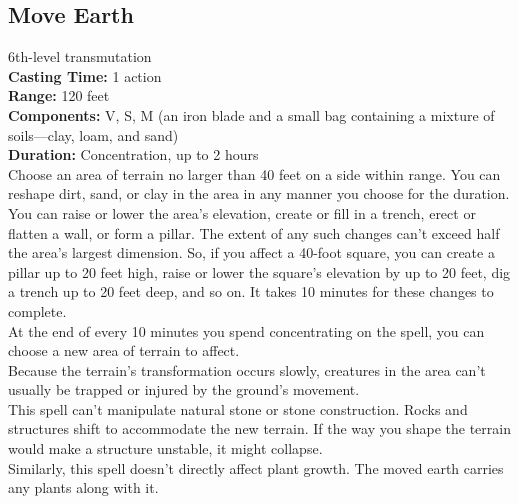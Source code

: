 \documentclass[11pt, A4paper, english]{article}
\begin{document}
		\subsection{Move Earth}
6th-level transmutation \\
\textbf{Casting Time:} 1 action \\
\textbf{Range:} 120 feet \\
\textbf{Components:} V, S, M (an iron blade and a small bag containing a mixture of soils—clay, loam, and sand) \\
\textbf{Duration:} Concentration, up to 2 hours \\
Choose an area of terrain no larger than 40 feet on a side within range. You can reshape dirt, sand, or clay in the area in any manner you choose for the duration. You can raise or lower the area’s elevation, create or fill in a trench, erect or flatten a wall, or form a pillar. The extent of any such changes can’t exceed half the area’s largest dimension. So, if you affect a 40-foot square, you can create a pillar up to 20 feet high, raise or lower the square’s elevation by up to 20 feet, dig a trench up to 20 feet deep, and so on. It takes 10 minutes for these changes to complete. \\
At the end of every 10 minutes you spend concentrating on the spell, you can choose a new area of terrain to affect. \\
Because the terrain’s transformation occurs slowly, creatures in the area can’t usually be trapped or injured by the ground’s movement. \\
This spell can’t manipulate natural stone or stone construction. Rocks and structures shift to accommodate the new terrain. If the way you shape the terrain would make a structure unstable, it might collapse. \\
Similarly, this spell doesn’t directly affect plant growth. The moved earth carries any plants along with it.
\end{document}
